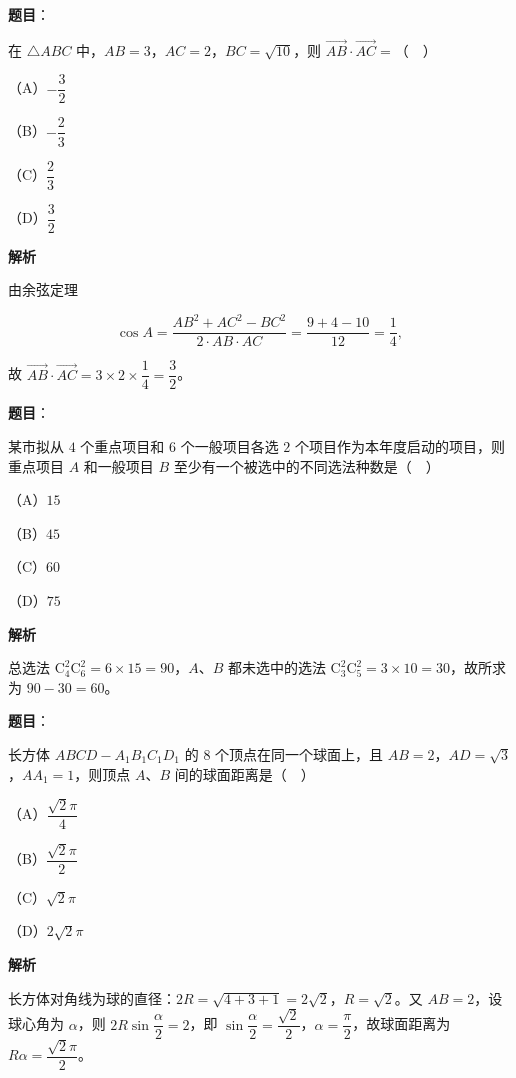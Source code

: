 \begin{answer}

\textbf{题目}：

在 $\triangle ABC$ 中，$AB=3$，$AC=2$，$BC=\sqrt{10}$，则 $\overrightarrow{AB}\cdot\overrightarrow{AC}=$（　）

（A）$-\dfrac32$

（B）$-\dfrac23$

（C）$\dfrac23$

（D）$\dfrac32$

\textbf{解析}

由余弦定理

\nopagebreak[4]
\[\cos A=\frac{AB^2+AC^2-BC^2}{2\cdot AB\cdot AC}=\frac{9+4-10}{12}=\frac14,\]

故 $\overrightarrow{AB}\cdot\overrightarrow{AC}=3\times2\times\dfrac14=\dfrac32$。


\end{answer}
\begin{answer}

\textbf{题目}：

某市拟从 $4$ 个重点项目和 $6$ 个一般项目各选 $2$ 个项目作为本年度启动的项目，则重点项目 $A$ 和一般项目 $B$ 至少有一个被选中的不同选法种数是（　）

（A）$15$

（B）$45$

（C）$60$

（D）$75$

\textbf{解析}

总选法 $\mathrm C_4^2\mathrm C_6^2=6\times15=90$，$A$、$B$ 都未选中的选法 $\mathrm C_3^2\mathrm C_5^2=3\times10=30$，故所求为 $90-30=60$。


\end{answer}
\begin{answer}

\textbf{题目}：

长方体 $ABCD-A_1B_1C_1D_1$ 的 $8$ 个顶点在同一个球面上，且 $AB=2$，$AD=\sqrt3$，$AA_1=1$，则顶点 $A$、$B$ 间的球面距离是（　）

（A）$\dfrac{\sqrt2\pi}4$

（B）$\dfrac{\sqrt2\pi}2$

（C）$\sqrt2\pi$

（D）$2\sqrt2\pi$

\textbf{解析}

长方体对角线为球的直径：$2R=\sqrt{4+3+1}=2\sqrt2$，$R=\sqrt2$。又 $AB=2$，设球心角为 $\alpha$，则 $2R\sin\dfrac\alpha2=2$，即 $\sin\dfrac\alpha2=\dfrac{\sqrt2}2$，$\alpha=\dfrac{\pi}2$，故球面距离为 $R\alpha=\dfrac{\sqrt2\pi}2$。


\end{answer}
